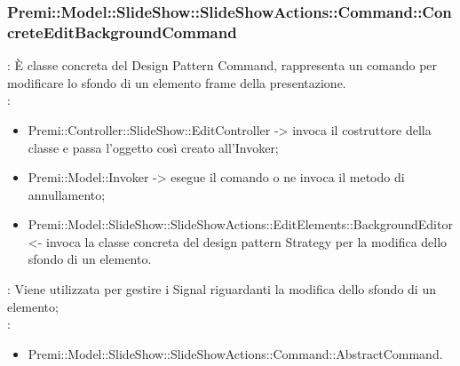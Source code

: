 {                     \subsubsection{Premi::Model::SlideShow::SlideShowActions::Command::ConcreteEditBackgroundCommand}{
				\textbf{\tipo}: È classe concreta del Design Pattern Command, rappresenta un comando per modificare lo sfondo di un elemento frame della presentazione.\\	
				\textbf{\relaz}: 
				\begin{itemize}
					\item Premi::Controller::SlideShow::EditController -> invoca il costruttore della classe e passa l’oggetto così creato all’Invoker;
                    \item Premi::Model::Invoker -> esegue il comando o ne invoca il metodo di annullamento;
                    \item Premi::Model::SlideShow::SlideShowActions::EditElements::BackgroundEditor <- invoca la classe concreta del design pattern Strategy per la modifica dello sfondo di un elemento.
				\end{itemize}	
                \textbf{\interfacce}: Viene utilizzata per gestire i Signal riguardanti la modifica dello sfondo di un elemento;\\
                \textbf{\base}: 
                    \begin{itemize}
                    \item Premi::Model::SlideShow::SlideShowActions::Command::AbstractCommand.
                    \end{itemize}
                    }
}
